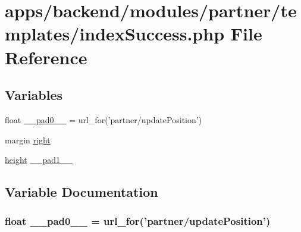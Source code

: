 \hypertarget{backend_2modules_2partner_2templates_2index_success_8php}{\section{apps/backend/modules/partner/templates/index\-Success.php File Reference}
\label{backend_2modules_2partner_2templates_2index_success_8php}
}
\subsection*{Variables}
\begin{DoxyCompactItemize}
\item 
float \hyperlink{backend_2modules_2partner_2templates_2index_success_8php_aa1230abe69f4cf7cb1115745f250d68d}{\-\_\-\-\_\-pad0\-\_\-\-\_\-} = url\-\_\-for('partner/update\-Position')
\item 
margin \hyperlink{backend_2modules_2partner_2templates_2index_success_8php_a9f3a98abc04200d1bbe440663d9aba96}{right}
\item 
\hyperlink{live_2modules_2partner_2templates_2__rolling_8php_aea65f358ba50c3ef234d1b922c6ffd8c}{height} \hyperlink{backend_2modules_2partner_2templates_2index_success_8php_a3f81b4bacf12d2b4f4cb3101046e4c00}{\-\_\-\-\_\-pad1\-\_\-\-\_\-}
\end{DoxyCompactItemize}


\subsection{Variable Documentation}
\hypertarget{backend_2modules_2partner_2templates_2index_success_8php_aa1230abe69f4cf7cb1115745f250d68d}{
\subsubsection[{\-\_\-\-\_\-pad0\-\_\-\-\_\-}]{\setlength{\rightskip}{0pt plus 5cm}float \-\_\-\-\_\-pad0\-\_\-\-\_\- = url\-\_\-for('partner/update\-Position')}}\label{backend_2modules_2partner_2templates_2index_success_8php_aa1230abe69f4cf7cb1115745f250d68d}


